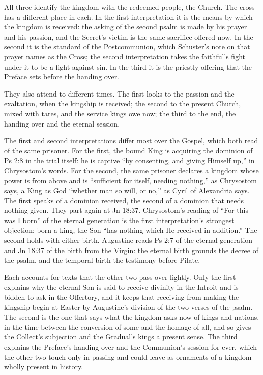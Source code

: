 All three identify the kingdom with the redeemed people, the Church. The cross
has a different place in each. In the first interpretation it is the means by
which the kingdom is received: the asking of the second psalm is made by his
prayer and his passion, and the Secret's victim is the same sacrifice offered
now. In the second it is
the standard of the Postcommunion, which Schuster's note on that prayer names
as the Cross; the second interpretation takes the faithful's fight under it to
be a fight against sin. In the third it is the priestly offering that the Preface
sets before the handing over.

They also attend to different times. The first looks to the passion
and the exaltation, when the kingship is received; the second to the present
Church, mixed with tares, and the service kings owe now; the third to the end,
the handing over and the eternal session.

The first and second interpretations differ most over the Gospel, which both
read of the same prisoner. For the first, the bound King is acquiring the
dominion of Ps 2:8 in the trial itself: he is captive ``by consenting, and
giving Himself up,'' in Chrysostom's words. For the second, the same prisoner
declares a kingdom whose power is from above and is ``sufficient for itself,
needing nothing,'' as Chrysostom says, a King as God ``whether man so will, or
no,'' as Cyril of Alexandria says. The first speaks of a dominion received, the
second of a dominion that needs nothing given. They part again at Jn 18:37.
Chrysostom's reading of ``For this was I born'' of the eternal generation is
the first interpretation's strongest objection: born a king, the Son ``has
nothing which He received in addition.'' The second holds with either birth.
Augustine reads Ps 2:7 of the eternal generation and Jn 18:37 of the birth from
the Virgin: the eternal birth grounds the decree of the psalm, and the temporal
birth the testimony before Pilate.

Each accounts for texts that the other two pass over lightly. Only the first
explains why the eternal Son is said to receive divinity in the Introit and is
bidden to ask in the Offertory, and it keeps that receiving from making the
kingship begin at Easter by Augustine's division of the two verses of the
psalm. The second is the one that says what the kingdom asks now of kings and
nations, in the time between the conversion of some and the homage of all, and
so gives the Collect's subjection and the Gradual's kings a present sense. The
third explains the Preface's handing over and the Communion's session for
ever, which the other two touch only in passing and could leave as ornaments
of a kingdom wholly present in history.

